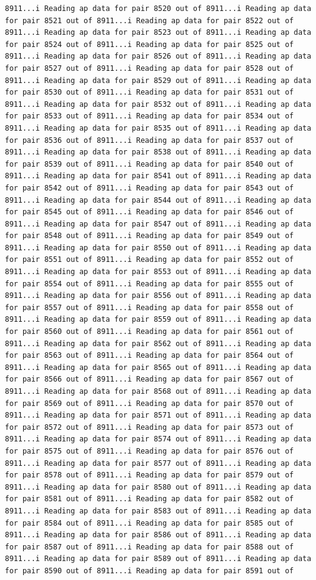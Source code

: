 \documentclass[
]{article}
\begin{document}
\begin{verbatim}
8911...i Reading ap data for pair 8520 out of 8911...i Reading ap data for pair 8521 out of 8911...i Reading ap data for pair 8522 out of 8911...i Reading ap data for pair 8523 out of 8911...i Reading ap data for pair 8524 out of 8911...i Reading ap data for pair 8525 out of 8911...i Reading ap data for pair 8526 out of 8911...i Reading ap data for pair 8527 out of 8911...i Reading ap data for pair 8528 out of 8911...i Reading ap data for pair 8529 out of 8911...i Reading ap data for pair 8530 out of 8911...i Reading ap data for pair 8531 out of 8911...i Reading ap data for pair 8532 out of 8911...i Reading ap data for pair 8533 out of 8911...i Reading ap data for pair 8534 out of 8911...i Reading ap data for pair 8535 out of 8911...i Reading ap data for pair 8536 out of 8911...i Reading ap data for pair 8537 out of 8911...i Reading ap data for pair 8538 out of 8911...i Reading ap data for pair 8539 out of 8911...i Reading ap data for pair 8540 out of 8911...i Reading ap data for pair 8541 out of 8911...i Reading ap data for pair 8542 out of 8911...i Reading ap data for pair 8543 out of 8911...i Reading ap data for pair 8544 out of 8911...i Reading ap data for pair 8545 out of 8911...i Reading ap data for pair 8546 out of 8911...i Reading ap data for pair 8547 out of 8911...i Reading ap data for pair 8548 out of 8911...i Reading ap data for pair 8549 out of 8911...i Reading ap data for pair 8550 out of 8911...i Reading ap data for pair 8551 out of 8911...i Reading ap data for pair 8552 out of 8911...i Reading ap data for pair 8553 out of 8911...i Reading ap data for pair 8554 out of 8911...i Reading ap data for pair 8555 out of 8911...i Reading ap data for pair 8556 out of 8911...i Reading ap data for pair 8557 out of 8911...i Reading ap data for pair 8558 out of 8911...i Reading ap data for pair 8559 out of 8911...i Reading ap data for pair 8560 out of 8911...i Reading ap data for pair 8561 out of 8911...i Reading ap data for pair 8562 out of 8911...i Reading ap data for pair 8563 out of 8911...i Reading ap data for pair 8564 out of 8911...i Reading ap data for pair 8565 out of 8911...i Reading ap data for pair 8566 out of 8911...i Reading ap data for pair 8567 out of 8911...i Reading ap data for pair 8568 out of 8911...i Reading ap data for pair 8569 out of 8911...i Reading ap data for pair 8570 out of 8911...i Reading ap data for pair 8571 out of 8911...i Reading ap data for pair 8572 out of 8911...i Reading ap data for pair 8573 out of 8911...i Reading ap data for pair 8574 out of 8911...i Reading ap data for pair 8575 out of 8911...i Reading ap data for pair 8576 out of 8911...i Reading ap data for pair 8577 out of 8911...i Reading ap data for pair 8578 out of 8911...i Reading ap data for pair 8579 out of 8911...i Reading ap data for pair 8580 out of 8911...i Reading ap data for pair 8581 out of 8911...i Reading ap data for pair 8582 out of 8911...i Reading ap data for pair 8583 out of 8911...i Reading ap data for pair 8584 out of 8911...i Reading ap data for pair 8585 out of 8911...i Reading ap data for pair 8586 out of 8911...i Reading ap data for pair 8587 out of 8911...i Reading ap data for pair 8588 out of 8911...i Reading ap data for pair 8589 out of 8911...i Reading ap data for pair 8590 out of 8911...i Reading ap data for pair 8591 out of 
\end{verbatim}
\end{document}
